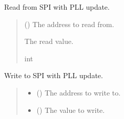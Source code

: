 \documentclass[letterpaper,10pt,english]{sphinxmanual}
\begin{document}
\begin{fulllineitems}
\begin{fulllineitems}
\label{\detokenize{apidocs:management.MANAGEMENT.pll_read_with_update}}
\pysigstartsignatures
{}
\pysigstopsignatures
\sphinxAtStartPar
Read from SPI with PLL update.
\begin{quote}\begin{description}
\sphinxAtStartPar
{} () \textendash{} The address to read from.

\sphinxAtStartPar
The read value.

\sphinxAtStartPar
int

\end{description}\end{quote}

\end{fulllineitems}


\begin{fulllineitems}
\label{\detokenize{apidocs:management.MANAGEMENT.pll_write_with_update}}
\pysigstartsignatures
{}
\pysigstopsignatures
\sphinxAtStartPar
Write to SPI with PLL update.
\begin{quote}\begin{description}
\begin{itemize}
\item {} 
\sphinxAtStartPar
{} () \textendash{} The address to write to.

\item {} 
\sphinxAtStartPar
{} () \textendash{} The value to write.

\end{itemize}

\end{description}\end{quote}


\end{fulllineitems}
\end{fulllineitems}
\end{document}
